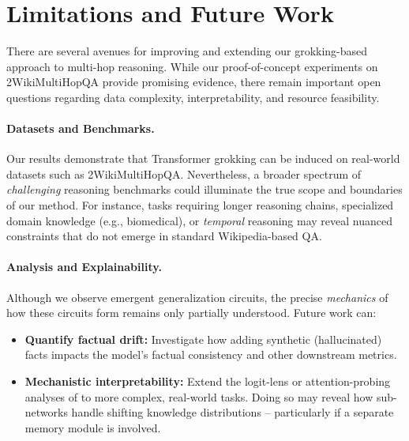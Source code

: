 \section{Limitations and Future Work}\label{sec:future_work}

There are several avenues for improving and extending our grokking-based approach to multi-hop reasoning. While our proof-of-concept experiments on 2WikiMultiHopQA provide promising evidence, there remain important open questions regarding data complexity, interpretability, and resource feasibility.

\paragraph{Datasets and Benchmarks.}
Our results demonstrate that Transformer grokking can be induced on real-world datasets such as 2WikiMultiHopQA. Nevertheless, a broader spectrum of \emph{challenging} reasoning benchmarks could illuminate the true scope and boundaries of our method. For instance, tasks requiring longer reasoning chains, specialized domain knowledge (e.g., biomedical), or \emph{temporal} reasoning may reveal nuanced constraints that do not emerge in standard Wikipedia-based QA.

\paragraph{Analysis and Explainability.}
Although we observe emergent generalization circuits, the precise \emph{mechanics} of how these circuits form remains only partially understood. Future work can:
\begin{itemize}
    \item \textbf{Quantify factual drift:} Investigate how adding synthetic (hallucinated) facts impacts the model’s factual consistency and other downstream metrics.
    \item \textbf{Mechanistic interpretability:} Extend the logit-lens or attention-probing analyses of \citet{wang_grokked_2024} to more complex, real-world tasks. Doing so may reveal how sub-networks handle shifting knowledge distributions -- particularly if a separate memory module is involved.
\end{itemize}

